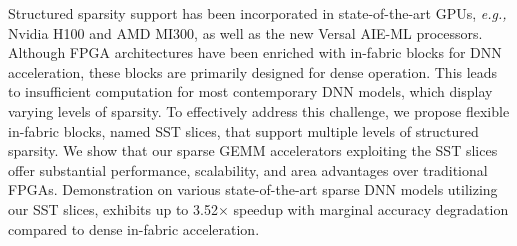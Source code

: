 


Structured sparsity support has been incorporated in state-of-the-art GPUs, \emph{e.g.,} Nvidia H100 and AMD MI300, as well as the new Versal AIE-ML processors.
Although FPGA architectures have been enriched with in-fabric blocks for DNN acceleration, these blocks are primarily designed for dense operation.
This leads to insufficient computation for most contemporary DNN models, which display varying levels of sparsity.
To effectively address this challenge, we propose flexible in-fabric blocks, named SST slices, that support multiple levels of structured sparsity. 
We show that our sparse GEMM accelerators exploiting the SST slices offer substantial performance, scalability, and area advantages over traditional FPGAs. 
Demonstration on various state-of-the-art sparse DNN models utilizing our SST slices, exhibits up to 3.52$\times$ speedup with marginal accuracy degradation compared to dense in-fabric acceleration.

\vspace{-1.2mm}
